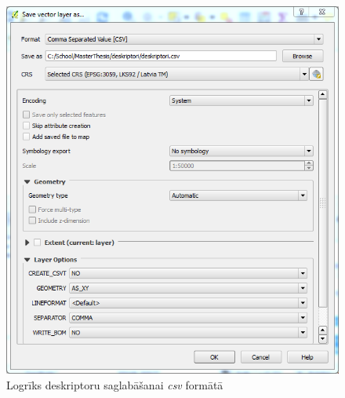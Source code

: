 \documentclass[12pt,paper=a4]{report}
\begin{document}
\begin{figure}[h!]
\centering
\includegraphics[scale=0.5]{saveAsCSV}
\caption{Logrīks deskriptoru saglabāšanai \textit{csv} formātā}
\label{fig:csv}
\end{figure}\par
\end{document}
